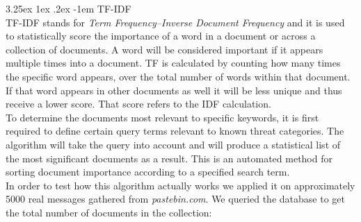 \documentclass[12pt]{article}
\makeatletter
\renewcommand\paragraph{\@startsection{paragraph}{5}{\z@}%
  {3.25ex \@plus1ex \@minus.2ex}%
  {-1em}%
  {\normalfont\normalsize\bfseries}}
\makeatother
\begin{document}
\paragraph{TF-IDF}
\hfill \break
\\
TF-IDF \cite{tf-idf} stands for \textit{Term Frequency–Inverse Document Frequency} and it is used to statistically score the importance of a word in a document or across a collection of documents. A word will be considered important if it appears multiple times into a document. TF is calculated by counting how many times the specific word appears, over the total number of words within that document. If that word appears in other documents as well it will be less unique and thus receive a lower score. That score refers to the IDF calculation. 
\hfill \break 
\\
To determine the documents most relevant to specific keywords, it is first required to define certain query terms relevant to known threat categories. The algorithm will take the query into account and will produce a statistical list of the most significant documents as a result. This is an automated method for sorting document importance according to a specified search term. 
\hfill \break 
\\
In order to test how this algorithm actually works we applied it on approximately 5000 real messages gathered from \textit{pastebin.com}. We queried the database to get the total number of documents in the collection:
\end{document}
